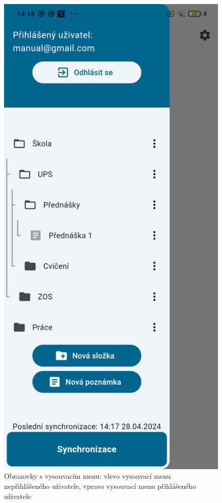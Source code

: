 \documentclass[czech, bc, kiv, he, iso690numb]{fasthesis}
\begin{document}
\begin{figure}[h!]
\begin{minipage}[h]{0.43\textwidth}
  \end{minipage}
  \hspace{10pt}
  \begin{minipage}[h]{0.43\textwidth}
    \includegraphics[width=\textwidth]{img/BP-Runt/UserManual/DrawerLoggedUser.jpg}
  \end{minipage}
  \caption{Obrazovky s vysouvacím menu: vlevo vysouvací menu nepřihlášeného uživatele, vpravo vysouvací menu přihlášeného uživatele}
  \label{fig:AppDrawer}
\end{figure}
\end{document}
